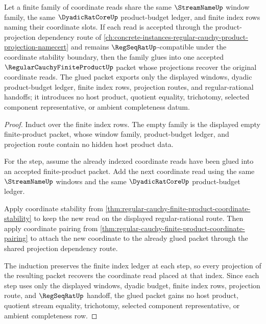 \begin{theorem}
\label{thm:regular-cauchy-finite-product-coordinate-gluing}
Let a finite family of coordinate reads share the same $\StreamNameUp$ window family, the same $\DyadicRatCoreUp$ product-budget ledger, and finite index rows naming their coordinate slots. If each read is accepted through the product-projection dependency route of \autoref{ch:concrete-instances-regular-cauchy-product-projection-namecert} and remains $\RegSeqRatUp$-compatible under the coordinate stability boundary, then the family glues into one accepted $\RegularCauchyFiniteProductUp$ packet whose projections recover the original coordinate reads. The glued packet exports only the displayed windows, dyadic product-budget ledger, finite index rows, projection routes, and regular-rational handoffs; it introduces no host product, quotient equality, trichotomy, selected component representative, or ambient completeness datum.
\end{theorem}
\begin{proof}
Induct over the finite index rows. The empty family is the displayed empty finite-product packet, whose window family, product-budget ledger, and projection route contain no hidden host product data.

For the step, assume the already indexed coordinate reads have been glued into an accepted finite-product packet. Add the next coordinate read using the same $\StreamNameUp$ windows and the same $\DyadicRatCoreUp$ product-budget ledger.

Apply coordinate stability from \autoref{thm:regular-cauchy-finite-product-coordinate-stability} to keep the new read on the displayed regular-rational route. Then apply coordinate pairing from \autoref{thm:regular-cauchy-finite-product-coordinate-pairing} to attach the new coordinate to the already glued packet through the shared projection dependency route.

The induction preserves the finite index ledger at each step, so every projection of the resulting packet recovers the coordinate read placed at that index. Since each step uses only the displayed windows, dyadic budget, finite index rows, projection route, and $\RegSeqRatUp$ handoff, the glued packet gains no host product, quotient stream equality, trichotomy, selected component representative, or ambient completeness row.
\end{proof}
